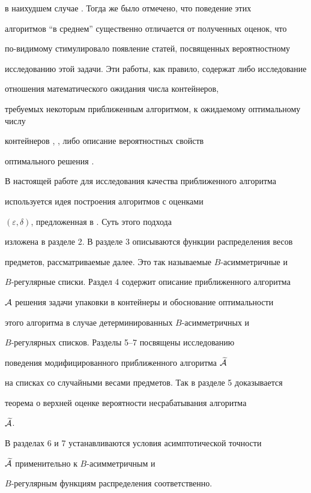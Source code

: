 в наихудшем случае \cite{JDUGG}. Тогда же было отмечено, что поведение этих


алгоритмов ``в среднем'' существенно отличается от полученных оценок, что


по-видимому стимулировало появление статей, посвященных вероятностному


исследованию этой задачи. Эти работы, как правило, содержат либо исследование


отношения математического ожидания числа контейнеров,


требуемых некоторым приближенным алгоритмом, к ожидаемому оптимальному числу


контейнеров \cite{F}, \cite{K}, либо описание вероятностных свойств


оптимального решения \cite{RT}.





В настоящей работе для исследования качества приближенного алгоритма


используется идея построения алгоритмов с оценками


$(\varepsilon,\delta)$, предложенная в \cite{GGP}. Суть этого подхода


изложена в разделе 2. В разделе 3 описываются функции распределения весов


предметов, рассматриваемые далее. Это так называемые $B$-асимметричные и


$B$-регулярные списки. Раздел 4 содержит описание приближенного алгоритма


${\cal A}$ решения задачи упаковки в контейнеры и обоснование оптимальности


этого алгоритма в случае детерминированных $B$-асимметричных и


$B$-регулярных списков. Разделы 5--7 посвящены исследованию


поведения модифицированного приближенного алгоритма $\widetilde{\cal A}$


на списках со случайными весами предметов. Так в разделе 5 доказывается


теорема о верхней оценке вероятности несрабатывания алгоритма


$\widetilde{\cal A}$.


В разделах 6 и 7 устанавливаются условия асимптотической точности


$\widetilde{\cal A}$ применительно к $B$-асимметричным и


$B$-регулярным функциям распределения соответственно.





